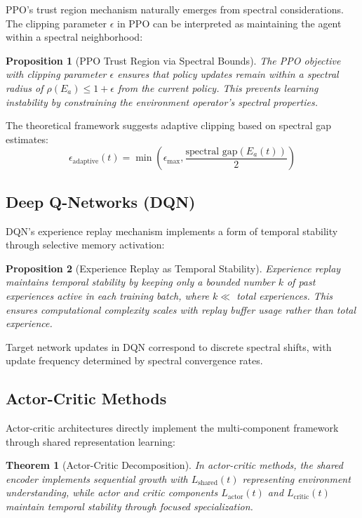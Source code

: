 \documentclass[11pt]{article}
\newtheorem{theorem}{Theorem}
\newtheorem{proposition}{Proposition}
\begin{document}
PPO's trust region mechanism naturally emerges from spectral considerations. The clipping parameter $\epsilon$ in PPO can be interpreted as maintaining the agent within a spectral neighborhood:

\begin{proposition}[PPO Trust Region via Spectral Bounds]
The PPO objective with clipping parameter $\epsilon$ ensures that policy updates remain within a spectral radius of $\rho(E_a) \leq 1 + \epsilon$ from the current policy. This prevents learning instability by constraining the environment operator's spectral properties.
\end{proposition}

The theoretical framework suggests adaptive clipping based on spectral gap estimates:
\begin{equation}
\epsilon_{\text{adaptive}}(t) = \min\left(\epsilon_{\text{max}}, \frac{\text{spectral gap}(E_a(t))}{2}\right)
\end{equation}

\subsection{Deep Q-Networks (DQN)}

DQN's experience replay mechanism implements a form of temporal stability through selective memory activation:

\begin{proposition}[Experience Replay as Temporal Stability]
Experience replay maintains temporal stability by keeping only a bounded number $k$ of past experiences active in each training batch, where $k \ll$ total experiences. This ensures computational complexity scales with replay buffer usage rather than total experience.
\end{proposition}

Target network updates in DQN correspond to discrete spectral shifts, with update frequency determined by spectral convergence rates.

\subsection{Actor-Critic Methods}

Actor-critic architectures directly implement the multi-component framework through shared representation learning:

\begin{theorem}[Actor-Critic Decomposition]
In actor-critic methods, the shared encoder implements sequential growth with $L_{\text{shared}}(t)$ representing environment understanding, while actor and critic components $L_{\text{actor}}(t)$ and $L_{\text{critic}}(t)$ maintain temporal stability through focused specialization.
\end{theorem}
\end{document}
